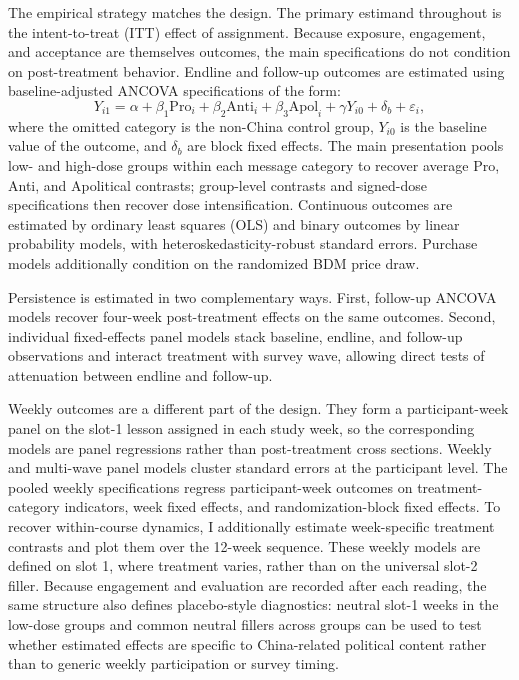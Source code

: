 \documentclass[12pt,american]{article}
\begin{document}
	The empirical strategy matches the design. The primary estimand throughout is the intent-to-treat (ITT) effect of assignment. Because exposure, engagement, and acceptance are themselves outcomes, the main specifications do not condition on post-treatment behavior. Endline and follow-up outcomes are estimated using baseline-adjusted ANCOVA specifications of the form:
	\[
	Y_{i1} = \alpha + \beta_1 \text{Pro}_i + \beta_2 \text{Anti}_i + \beta_3 \text{Apol}_i + \gamma Y_{i0} + \delta_b + \varepsilon_i,
	\]
	where the omitted category is the non-China control group, \(Y_{i0}\) is the baseline value of the outcome, and \(\delta_b\) are block fixed effects. The main presentation pools low- and high-dose groups within each message category to recover average Pro, Anti, and Apolitical contrasts; group-level contrasts and signed-dose specifications then recover dose intensification. Continuous outcomes are estimated by ordinary least squares (OLS) and binary outcomes by linear probability models, with heteroskedasticity-robust standard errors. Purchase models additionally condition on the randomized BDM price draw.
	
	Persistence is estimated in two complementary ways. First, follow-up ANCOVA models recover four-week post-treatment effects on the same outcomes. Second, individual fixed-effects panel models stack baseline, endline, and follow-up observations and interact treatment with survey wave, allowing direct tests of attenuation between endline and follow-up.

	Weekly outcomes are a different part of the design. They form a participant-week panel on the slot-1 lesson assigned in each study week, so the corresponding models are panel regressions rather than post-treatment cross sections. Weekly and multi-wave panel models cluster standard errors at the participant level. The pooled weekly specifications regress participant-week outcomes on treatment-category indicators, week fixed effects, and randomization-block fixed effects. To recover within-course dynamics, I additionally estimate week-specific treatment contrasts and plot them over the 12-week sequence. These weekly models are defined on slot 1, where treatment varies, rather than on the universal slot-2 filler. Because engagement and evaluation are recorded after each reading, the same structure also defines placebo-style diagnostics: neutral slot-1 weeks in the low-dose groups and common neutral fillers across groups can be used to test whether estimated effects are specific to China-related political content rather than to generic weekly participation or survey timing.
	
\end{document}
